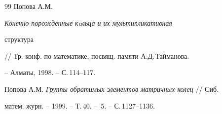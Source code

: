 \begin{thebibliography}{99}
Попова А.М. {\em Конечно-порожденные кoльца и их мультипликативная 


структура} // Тр. конф. по математике, посвящ. памяти А.Д.\,Тайманова.


-- Алматы, 1998. -- С.\,114--117.







Попова А.М. {\em Группы обратимых элементов матричных колец} // Сиб.


матем. журн. -- 1999. -- Т.\,40. -- \No\,5. -- С.\,1127--1136.





\end{thebibliography}





\vskip 0.5cm












\label{end}











